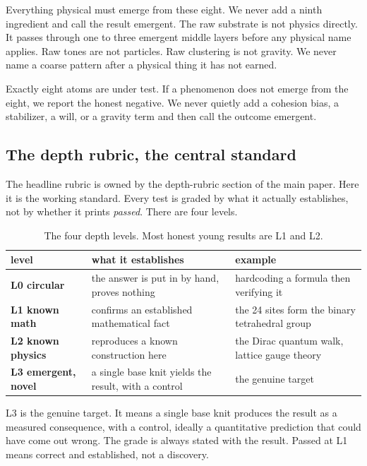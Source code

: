 Everything physical must emerge from these eight. We never add a ninth ingredient and call the result emergent. The raw substrate is not physics directly. It passes through one to three emergent middle layers before any physical name applies. Raw tones are not particles. Raw clustering is not gravity. We never name a coarse pattern after a physical thing it has not earned.

\begin{principle}
Exactly eight atoms are under test. If a phenomenon does not emerge from the eight, we report the honest negative. We never quietly add a cohesion bias, a stabilizer, a will, or a gravity term and then call the outcome emergent.
\end{principle}

\subsection{The depth rubric, the central standard}

The headline rubric is owned by the depth-rubric section of the main paper. Here it is the working standard. Every test is graded by what it actually establishes, not by whether it prints \emph{passed}. There are four levels.

\begin{table}[ht]
\centering
\begin{tabular}{@{}lll@{}}
\toprule
level & what it establishes & example \\
\midrule
\textbf{L0 circular} & the answer is put in by hand, proves nothing & hardcoding a formula then verifying it \\
\textbf{L1 known math} & confirms an established mathematical fact & the 24 sites form the binary tetrahedral group \\
\textbf{L2 known physics} & reproduces a known construction here & the Dirac quantum walk, lattice gauge theory \\
\textbf{L3 emergent, novel} & a single base knit yields the result, with a control & the genuine target \\
\bottomrule
\end{tabular}
\caption{The four depth levels. Most honest young results are L1 and L2.}
\label{tab:depth-rubric}
\end{table}

L3 is the genuine target. It means a single base knit produces the result as a measured consequence, with a control, ideally a quantitative prediction that could have come out wrong. The grade is always stated with the result. Passed at L1 means correct and established, not a discovery.

